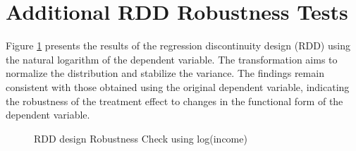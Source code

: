 \documentclass[11pt]{article}
\begin{document}
\clearpage

\section{Additional RDD Robustness Tests} \label{sec:additional_rdd}
% 

Figure \ref{fig:RD_design_Robust} presents the results of the regression discontinuity design (RDD) using the natural logarithm of the dependent variable. The transformation aims to normalize the distribution and stabilize the variance. The findings remain consistent with those obtained using the original dependent variable, indicating the robustness of the treatment effect to changes in the functional form of the dependent variable.

\begin{figure}[ht]
  \centering
  \hfill %
  \hfill %
  \caption{RDD design Robustness Check using log(income)}
  \label{fig:RD_design_Robust}
\end{figure}
\end{document}
